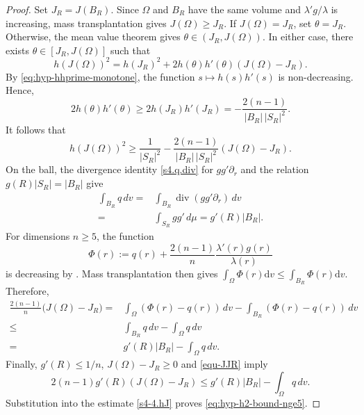 \documentclass[11pt,reqno]{amsart}
\numberwithin{equation}{section}
\theoremstyle{definition}
\newcommand{\diver}{\operatorname{div}}
\begin{document}
\begin{proof}
Set $J_R=J(B_R)$. Since $\Omega$ and $B_R$ have the same volume and $\lambda'g/\lambda$ is increasing, mass transplantation gives $J(\Omega)\geq J_R$.  If $J(\Omega)=J_R$, set $\theta=J_R$. Otherwise, the mean value theorem gives $\theta\in(J_R,J(\Omega))$. In either case, there exists $\theta\in[J_R,J(\Omega)]$ such that
\begin{equation*}
    h(J(\Omega))^2 = h(J_R)^2 + 2h(\theta)h'(\theta)(J(\Omega)-J_R).
\end{equation*}
By \eqref{eq:hyp-hhprime-monotone}, the function $s\mapsto h(s)h'(s)$ is non-decreasing. Hence,
\begin{equation*}
    2h(\theta)h'(\theta) \geq 2h(J_R)h'(J_R)
    =-\frac{2(n-1)}{|B_R|\,|S_R|^2}.
\end{equation*}
It follows that
\begin{equation}\label{s4-4.hJ}
    h(J(\Omega))^2
    \geq
    \frac1{|S_R|^2}
    -\frac{2(n-1)}{|B_R|\,|S_R|^2}(J(\Omega)-J_R).
\end{equation}
On the ball, the divergence identity \eqref{s4.q.div} for $gg'\partial_r$ and the relation $g(R)|S_R|=|B_R|$ give
\begin{align}\label{s4-4.q}
    \int_{B_R}q\,dv
    =&\int_{B_R} \diver(gg'\partial_r)\,dv \nonumber\\
    =&\int_{S_R}gg'\,d\mu
    =g'(R)|B_R|.
\end{align}
For dimensions $n\geq 5$, the function
\begin{equation*}
    \Phi(r):=q(r)+\frac{2(n-1)}{n}\frac{\lambda'(r)g(r)}{\lambda(r)}
\end{equation*}
is decreasing by \cite[Lemma~4.4]{GuLiWan2025}.  Mass transplantation then gives $\int_{\Omega}\Phi(r)\mathrm{d}v\leq \int_{B_R}\Phi(r)\mathrm{d}v$. Therefore, %
\begin{align}\label{equ-JJR}
    \frac{2(n-1)}{n}\bigl(J(\Omega)-J_R\bigr)
   =&\int_\Omega \left(\Phi(r)-q(r)\right)\,dv-\int_{B_R} \left(\Phi(r)-q(r)\right)\,dv\nonumber\\
   \leq &  \int_{B_R}q\,dv-\int_\Omega q\,dv\nonumber\\
  = &
    g'(R)|B_R|-\int_\Omega q\,dv.
\end{align}
Finally, $g'(R)\leq1/n$, $J(\Omega)-J_R\geq0$ and \eqref{equ-JJR} imply
\begin{equation*}
    2(n-1)g'(R)(J(\Omega)-J_R)
    \leq g'(R)|B_R|-\int_\Omega q\,dv.
\end{equation*}
Substitution into the estimate \eqref{s4-4.hJ} proves \eqref{eq:hyp-h2-bound-nge5}.
\end{proof}
\end{document}
